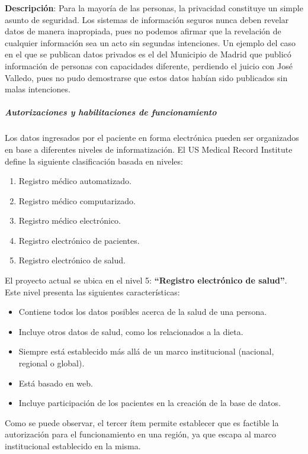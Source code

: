 \begin{enumerate}
            \textbf{Descripción}:
            Para la mayoría de las personas, la privacidad constituye un simple asunto de seguridad.
            Los sistemas de información seguros nunca deben revelar datos de manera inapropiada, pues no podemos afirmar que la revelación de cualquier información sea un acto sin segundas intenciones.
            Un ejemplo del caso en el que se publican datos privados es el del Municipio de Madrid que publicó información de personas con capacidades diferente, perdiendo el juicio con José Valledo, pues no pudo demostrarse que estos datos habían sido publicados sin malas intenciones.            
    \end{enumerate}
    
    
\subparagraph{Autorizaciones y habilitaciones de funcionamiento}
    
    Los datos ingresados por el paciente en forma electrónica pueden ser organizados en base a diferentes niveles de informatización.
    El US Medical Record Institute define la siguiente clasificación basada en niveles:
    
    \begin{enumerate}
		\item Registro médico automatizado.
        \item Registro médico computarizado.
        \item Registro médico electrónico.
        \item Registro electrónico de pacientes.
        \item Registro electrónico de salud.
	\end{enumerate}
    
    El proyecto actual se ubica en el nivel 5: \textbf{``Registro electrónico de salud''}.
    Este nivel presenta las siguientes características:
    
    \begin{itemize}
		\item Contiene todos los datos posibles acerca de la salud de una persona.
        \item Incluye otros datos de salud, como los relacionados a la dieta.
        \item Siempre está establecido más allá de un marco institucional (nacional, regional o global).
        \item Está basado en web.
        \item Incluye participación de los pacientes en la creación de la base de datos.
	\end{itemize}
    Como se puede observar, el tercer ítem permite establecer que es factible la autorización para el funcionamiento en una región, ya que escapa al marco institucional establecido en la misma.    
    

